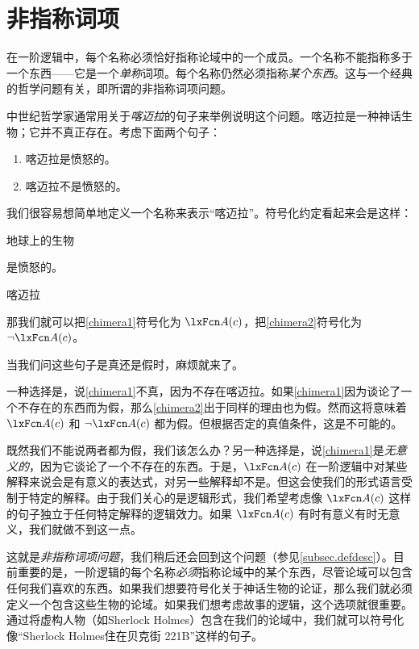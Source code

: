 \section{非指称词项}
在一阶逻辑中，每个名称必须恰好指称论域中的一个成员。一个名称不能指称多于一个东西——它是一个\emph{单称}词项。每个名称仍然必须指称\emph{某个东西}。这与一个经典的哲学问题有关，即所谓的非指称词项问题。

中世纪哲学家通常用关于\emph{喀迈拉}的句子来举例说明这个问题。喀迈拉是一种神话生物；它并不真正存在。考虑下面两个句子：

\begin{enumerate}
\item\label{chimera1} 喀迈拉是愤怒的。
\item\label{chimera2} 喀迈拉不是愤怒的。
\end{enumerate}

我们很容易想简单地定义一个名称来表示“喀迈拉”。符号化约定看起来会是这样：

\begin{ekey}
\item[\text{论域}] 地球上的生物
\item[\atom{A}{x}]  是愤怒的。
\item[c] 喀迈拉
\end{ekey}

那我们就可以把\cref*{chimera1}符号化为 $\atom{A}{c}$，把\cref*{chimera2}符号化为 $\enot \atom{A}{c}$。

当我们问这些句子是真还是假时，麻烦就来了。

一种选择是，说\cref*{chimera1}不真，因为不存在喀迈拉。如果\cref*{chimera1}因为谈论了一个不存在的东西而为假，那么\cref*{chimera2}出于同样的理由也为假。然而这将意味着 $\atom{A}{c}$ 和 $\enot \atom{A}{c}$ 都为假。但根据否定的真值条件，这是不可能的。

既然我们不能说两者都为假，我们该怎么办？另一种选择是，说\cref*{chimera1}是\emph{无意义的}，因为它谈论了一个不存在的东西。于是，$\atom{A}{c}$ 在一阶逻辑中对某些解释来说会是有意义的表达式，对另一些解释却不是。但这会使我们的形式语言受制于特定的解释。由于我们关心的是逻辑形式，我们希望考虑像 $\atom{A}{c}$ 这样的句子独立于任何特定解释的逻辑效力。如果 $\atom{A}{c}$ 有时有意义有时无意义，我们就做不到这一点。

这就是\emph{非指称词项问题}，我们稍后还会回到这个问题（参见\cref{subsec.defdesc}）。目前重要的是，一阶逻辑的每个名称\emph{必须}指称论域中的某个东西，尽管论域可以包含任何我们喜欢的东西。如果我们想要符号化关于神话生物的论证，那么我们就必须定义一个包含这些生物的论域。如果我们想考虑故事的逻辑，这个选项就很重要。通过将虚构人物（如Sherlock Holmes）包含在我们的论域中，我们就可以符号化像“Sherlock Holmes住在贝克街 221B”这样的句子。

